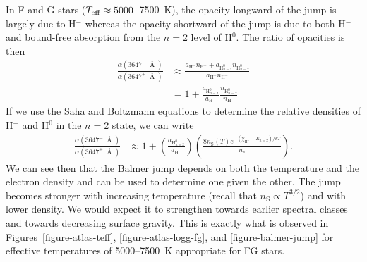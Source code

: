 In F and G stars ($T_\mathrm{eff} \approx 5000$--7500~K), the opacity longward of the jump is
largely due to H$^-$ whereas the opacity shortward of the
jump is due to both H$^-$ and bound-free absorption from the
$n=2$ level of H$^0$. The ratio of opacities is then
\begin{align}
\frac{\alpha(3647^-\:{\Angstrom})}{\alpha(3647^+\:{\Angstrom})}
&\approx
\frac{a_\mathrm{H^-} n_\mathrm{H^-} + a_{\mathrm{H}^0_{n=2}}
n_{\mathrm{H}^0_{n=2}}}
{a_\mathrm{H^-} n_\mathrm{H^-}}\\
&= 1 +
\frac{a_{\mathrm{H}^0_{n=2}}}{a_\mathrm{H^-}}
\frac{n_{\mathrm{H}^0_{n=2}}}{n_\mathrm{H^-}}
\end{align}
If we use the Saha and Boltzmann equations to determine the
relative densities of H$^-$ and H$^0$ in the $n=2$ state, we
can write
\begin{align}
\frac{\alpha(3647^-\:{\Angstrom})}{\alpha(3647^+\:{\Angstrom})}
&\approx
1 +
\left(\frac{a_{\mathrm{H}^0_{n=2}}}{a_\mathrm{H^-}}\right)
\left(\frac{8n_\mathrm{S}(T)e^{-(\chi_\mathrm{H^-} + E_{n=2})/kT}}{n_e}\right)
.
\end{align}
We can see then that the Balmer jump depends on both the
temperature and the electron density and can be used to
determine one given the other. The jump becomes stronger
with increasing temperature (recall that $n_\mathrm{S}
\propto T^{3/2}$) and with lower density. We would expect
it to strengthen towards earlier spectral classes and
towards decreasing surface gravity. This is exactly what is
observed in Figures~\ref{figure-atlas-teff}, \ref{figure-atlas-logg-fg}, and \ref{figure-balmer-jump}
 for effective temperatures of 5000--7500~K appropriate for FG stars.

